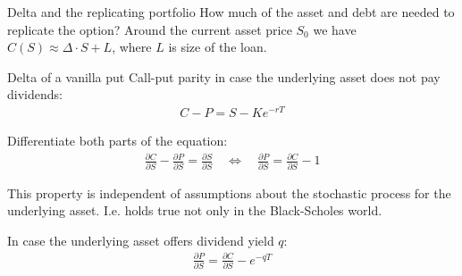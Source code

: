 \documentclass{beamer}
\begin{document}
\begin{frame}{Delta and the replicating portfolio}
\justify
How much of the asset and debt are needed to replicate the option? Around the current asset price $S_0$ we have $C(S) \approx \Delta \cdot S + L$, where $L$ is size of the loan.

\justify
\centering
{}
\end{frame}



\begin{frame}{Delta of a vanilla put}
\justify
Call-put parity in case the underlying asset does not pay dividends:
\begin{align*}
C - P = S - Ke^{-rT}
\end{align*}

\justify
Differentiate both parts of the equation:
\begin{align*}
\frac{\partial C}{\partial S} - \frac{\partial P}{\partial S} = \frac{\partial S}{\partial S} \quad \Leftrightarrow \quad \frac{\partial P}{\partial S} = \frac{\partial C}{\partial S} - 1
\end{align*}

\justify
This property is independent of assumptions about the stochastic process for the underlying asset. I.e. holds true not only in the Black-Scholes world.

\justify
In case the underlying asset offers dividend yield  $q$:
\begin{align*}
\frac{\partial P}{\partial S} = \frac{\partial C}{\partial S} - e^{-qT}
\end{align*}
\end{frame}
\end{document}
